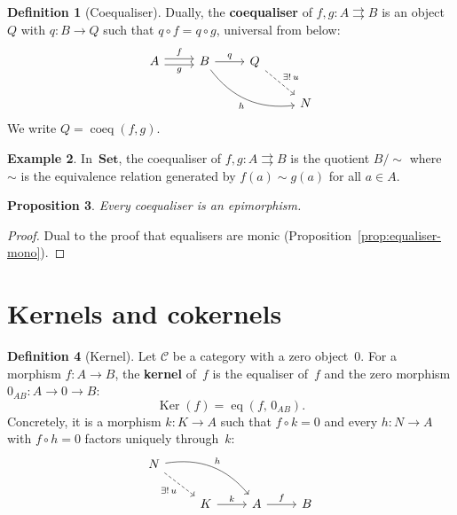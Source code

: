\documentclass[a4paper,12pt]{book}
\DeclareMathOperator{\Ker}{Ker}
\DeclareMathOperator{\eq}{eq}
\DeclareMathOperator{\coeq}{coeq}
\newcommand{\Set}{\mathbf{Set}}
\theoremstyle{definition}
\newtheorem{definition}{Definition}[section]
\newtheorem{example}[definition]{Example}
\theoremstyle{plain}
\newtheorem{proposition}[definition]{Proposition}
\theoremstyle{remark}
\begin{document}
\begin{definition}[Coequaliser]\label{def:coequaliser}
Dually, the \textbf{coequaliser} of $f,g\colon A\rightrightarrows B$
is an object $Q$ with $q\colon B\to Q$ such that $q\circ f = q\circ g$,
universal from below:
\[
\begin{tikzcd}
A \arrow[r, shift left, "f"] \arrow[r, shift right, "g"'] &
B \arrow[r, "q"] \arrow[rrd, bend right, "h"'] &
Q \arrow[rd, dashed, "\exists!\,u"] & \\
& & & N
\end{tikzcd}
\]
We write $Q = \coeq(f,g)$.
\end{definition}

\begin{example}\label{ex:coequaliser-set}
\index{coequaliser!in Set@in $\Set$}
In~$\Set$, the coequaliser of $f,g\colon A\rightrightarrows B$ is the
quotient $B/{\sim}$ where $\sim$ is the equivalence relation generated
by $f(a)\sim g(a)$ for all $a\in A$.
\end{example}

\begin{proposition}\label{prop:coequaliser-epi}
Every coequaliser is an epimorphism.
\end{proposition}

\begin{proof}
Dual to the proof that equalisers are monic (Proposition~\ref{prop:equaliser-mono}).
\end{proof}


\section{Kernels and cokernels}\label{sec:kernels-cokernels}

\begin{definition}[Kernel]\label{def:kernel-categorical}
Let $\mathcal{C}$ be a category with a zero object~$0$.
For a morphism $f\colon A\to B$, the \textbf{kernel} of~$f$ is the
equaliser of~$f$ and the zero morphism $0_{AB}\colon A\to 0\to B$:
\[
\Ker(f) = \eq(f,\,0_{AB}).
\]
Concretely, it is a morphism $k\colon K\to A$ such that $f\circ k = 0$
and every $h\colon N\to A$ with $f\circ h = 0$ factors uniquely through~$k$:
\[
\begin{tikzcd}
N \arrow[dr, dashed, "\exists!\,u"'] \arrow[drr, bend left, "h"] & & \\
& K \arrow[r, "k"] & A \arrow[r, "f"] & B
\end{tikzcd}
\]
\end{definition}
\end{document}
